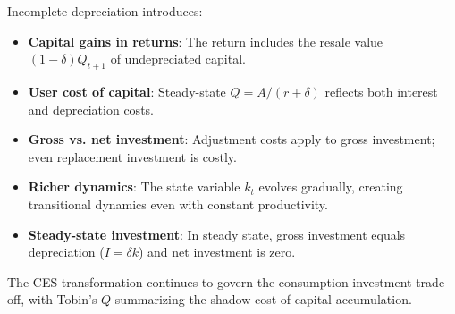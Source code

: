 \begin{callouttip}
Incomplete depreciation introduces:
\begin{itemize}[nosep]
\item \textbf{Capital gains in returns}: The return includes the resale value $(1-\delta) Q_{t+1}$ of undepreciated capital.
\item \textbf{User cost of capital}: Steady-state $Q = A/(r + \delta)$ reflects both interest and depreciation costs.
\item \textbf{Gross vs. net investment}: Adjustment costs apply to gross investment; even replacement investment is costly.
\item \textbf{Richer dynamics}: The state variable $k_t$ evolves gradually, creating transitional dynamics even with constant productivity.
\item \textbf{Steady-state investment}: In steady state, gross investment equals depreciation ($I = \delta k$) and net investment is zero.
\end{itemize}
The CES transformation continues to govern the consumption-investment trade-off, with Tobin's $Q$ summarizing the shadow cost of capital accumulation.
\end{callouttip}
